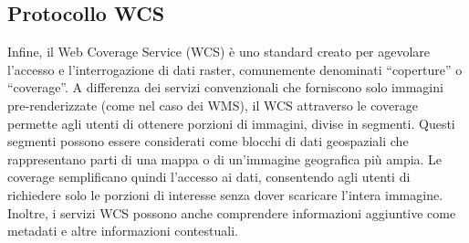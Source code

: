 \subsection{Protocollo WCS}

Infine, il Web Coverage Service (WCS) è uno standard creato per agevolare l'accesso e l'interrogazione di dati raster, comunemente denominati ``coperture'' o ``coverage''.
A differenza dei servizi convenzionali che forniscono solo immagini pre-renderizzate (come nel caso dei WMS), il WCS attraverso le coverage permette agli utenti di ottenere porzioni di immagini, divise in segmenti. Questi segmenti possono essere considerati come blocchi di dati geospaziali che rappresentano parti di una mappa o di un'immagine geografica più ampia. Le coverage semplificano quindi l'accesso ai dati, consentendo agli utenti di richiedere solo le porzioni di interesse senza dover scaricare l'intera immagine.
\\Inoltre, i servizi WCS possono anche comprendere informazioni aggiuntive come metadati e altre informazioni contestuali.



